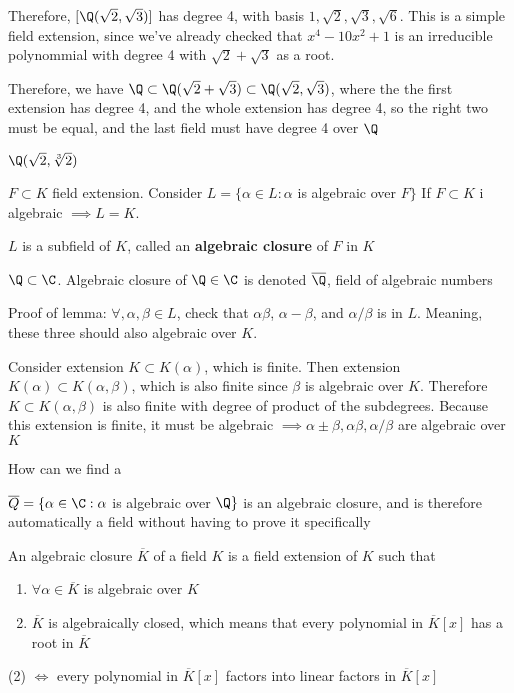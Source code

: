\documentclass[twoside, 10pt]{article}
\begin{document}
Therefore, $[\Q(\sqrt2, \sqrt3)]$ has degree 4, with basis $1, \sqrt{2}, \sqrt{3}, \sqrt{6}$. This is a simple field extension, since we've already checked that $x^4 - 10x^2 + 1$ is an irreducible polynommial with degree 4 with $\sqrt{2} + \sqrt{3}$ as a root. 

Therefore, we have $\Q \subset \Q(\sqrt2 + \sqrt3) \subset \Q(\sqrt2, \sqrt3)$, where the the first extension has degree 4, and the whole extension has degree 4, so the right two must be equal, and the last field must have degree 4 over $\Q$

\begin{exm*}
    $\Q(\sqrt{2}, \sqrt[3]{2})$
\end{exm*}

$F \subset K$ field extension. Consider $L = \{ \alpha \in L : \alpha$ is algebraic over $F \}$ If $F\subset K$ i algebraic $\implies L = K$. 

\begin{lem}
    $L$ is a subfield of $K$, called an \textbf{algebraic closure} of $F$ in $K$
\end{lem}

\begin{exm*}
    $\Q \subset \C$. Algebraic closure of $\Q \in \C$ is denoted $\overline{\Q}$, field of algebraic numbers
\end{exm*}
Proof of lemma: $\forall, \alpha, \beta \in L$, check that $\alpha\beta$, $\alpha - \beta$, and $\alpha/\beta$ is in $L$. Meaning, these three should also algebraic over $K$.

Consider extension $K \subset K(\alpha)$, which is finite. Then extension $K(\alpha) \subset K(\alpha, \beta)$, which is also finite since $\beta$ is algebraic over $K$. Therefore $K \subset K(\alpha, \beta)$ is also finite with degree of product of the subdegrees. Because this extension is finite, it must be algebraic $\implies \alpha \pm \beta, \alpha\beta, \alpha/\beta$ are algebraic over $K$

\begin{rmk}
    How can we find a 
\end{rmk}

\begin{exm*}
    $\overline{Q} = \{ \alpha \in \C : \alpha$ is algebraic over $\Q\}$ is an algebraic closure, and is therefore automatically a field without having to prove it specifically
\end{exm*}

\begin{defn}
    An algebraic closure $\overline{K}$ of a field $K$ is a field extension of $K$ such that \begin{enumerate}
        \item $\forall\alpha \in \overline{K}$ is algebraic over $K$
        \item $\overline{K}$ is algebraically closed, which means that every polynomial in $\overline{K}[x]$ has a root in $\overline{K}$
    \end{enumerate}
\end{defn}
(2) $\iff$ every polynomial in $\overline{K}[x]$ factors into linear factors in $\overline{K}[x]$
\end{document}
